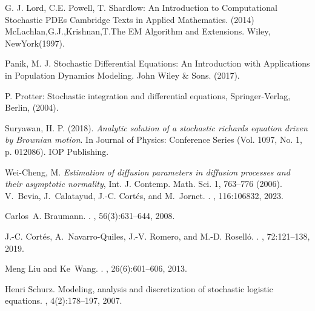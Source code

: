 \documentclass[12pt, reqno]{amsart}
\newcommand{\1}{{\bf 1}}
\newcommand{\2}{{\bf 2}}
\theoremstyle{definition}
\theoremstyle{remark}
\numberwithin{equation}{section}
\begin{document}
\begin{thebibliography}{999}
 G. J. Lord, C.E. Powell, T. Shardlow:  An Introduction to Computational Stochastic PDEs
Cambridge Texts in Applied Mathematics. (2014)
 McLachlan,G.J.,Krishnan,T.The EM Algorithm and Extensions. Wiley, NewYork(1997).

 Panik, M. J.  Stochastic Differential Equations: An Introduction with Applications in Population Dynamics Modeling. John Wiley \& Sons. (2017).


 P. Protter: Stochastic integration and differential equations, Springer-Verlag, Berlin, (2004).

 Suryawan, H. P. (2018). {\it Analytic solution of a stochastic richards equation driven by Brownian motion}. In Journal of Physics: Conference Series (Vol. 1097, No. 1, p. 012086). IOP Publishing.

 Wei-Cheng, M. {\it Estimation of diffusion parameters in diffusion processes and their asymptotic
normality}, Int. J. Contemp. Math. Sci. 1, 763–776 (2006).
V.~Bevia, J.~Calatayud, J.-C. Cortés, and M.~Jornet.
.
,
  116:106832, 2023.

Carlos~A. Braumann.
.
, 56(3):631--644,
  2008.

J.-C. Cortés, A.~Navarro-Quiles, J.-V. Romero, and M.-D. Roselló.
.
,
  72:121--138, 2019.

Meng Liu and Ke~Wang.
.
, 26(6):601--606, 2013.

Henri Schurz.
\newblock Modeling, analysis and discretization of stochastic logistic
  equations.
, 4(2):178--197, 2007.



\end{thebibliography}
\end{document}
